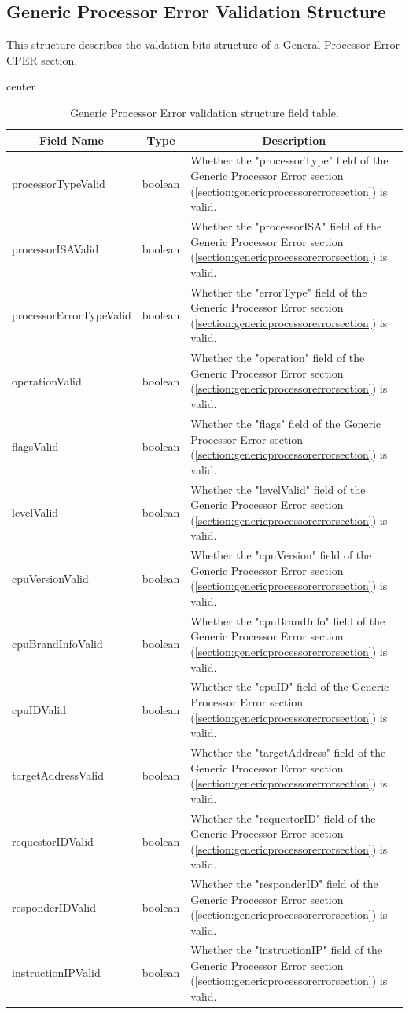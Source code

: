 \documentclass{report}
\newcommand*{\thead}[1]{\multicolumn{1}{|c|}{\bfseries #1}}
\newcommand*{\jsontable}[1]{
    \begin{table}[!ht]
    \label{#1}
    \centering
    \begin{adjustbox}{center}
    \begin{tabular}{|l|c|p{8cm}|}
    \hline
    \thead{Field Name} & \thead{Type} & \thead{Description} \\
    \hline
}
\newcommand*{\jsontableend}[1]{
    \hline
    \end{tabular}
    \end{adjustbox}
    \caption{#1}
    \label{table:#1}
    \end{table}
    \FloatBarrier
}
\begin{document}
\subsection{Generic Processor Error Validation Structure}
\label{subsection:genericprocessorvalidationstructure}
This structure describes the valdation bits structure of a General Processor Error CPER section.
\jsontable{table:genericprocessorvalidationstructure}
processorTypeValid & boolean & Whether the "processorType" field of the Generic Processor Error section (\ref{section:genericprocessorerrorsection}) is valid.\\
\hline
processorISAValid & boolean & Whether the "processorISA" field of the Generic Processor Error section (\ref{section:genericprocessorerrorsection}) is valid.\\
\hline
processorErrorTypeValid & boolean & Whether the "errorType" field of the Generic Processor Error section (\ref{section:genericprocessorerrorsection}) is valid.\\
\hline
operationValid & boolean & Whether the "operation" field of the Generic Processor Error section (\ref{section:genericprocessorerrorsection}) is valid.\\
\hline
flagsValid & boolean & Whether the "flags" field of the Generic Processor Error section (\ref{section:genericprocessorerrorsection}) is valid.\\
\hline
levelValid & boolean & Whether the "levelValid" field of the Generic Processor Error section (\ref{section:genericprocessorerrorsection}) is valid.\\
\hline
cpuVersionValid & boolean & Whether the "cpuVersion" field of the Generic Processor Error section (\ref{section:genericprocessorerrorsection}) is valid.\\
\hline
cpuBrandInfoValid & boolean & Whether the "cpuBrandInfo" field of the Generic Processor Error section (\ref{section:genericprocessorerrorsection}) is valid.\\
\hline
cpuIDValid & boolean & Whether the "cpuID" field of the Generic Processor Error section (\ref{section:genericprocessorerrorsection}) is valid.\\
\hline
targetAddressValid & boolean & Whether the "targetAddress" field of the Generic Processor Error section (\ref{section:genericprocessorerrorsection}) is valid.\\
\hline
requestorIDValid & boolean & Whether the "requestorID" field of the Generic Processor Error section (\ref{section:genericprocessorerrorsection}) is valid.\\
\hline
responderIDValid & boolean & Whether the "responderID" field of the Generic Processor Error section (\ref{section:genericprocessorerrorsection}) is valid.\\
\hline
instructionIPValid & boolean & Whether the "instructionIP" field of the Generic Processor Error section (\ref{section:genericprocessorerrorsection}) is valid.\\
\jsontableend{Generic Processor Error validation structure field table.}
\end{document}
